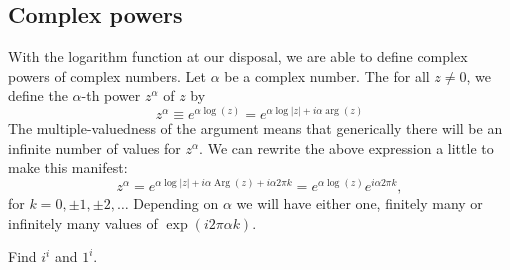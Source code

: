 \subsection{Complex powers}
With the logarithm function at our disposal, we are able to define complex powers of complex numbers. Let $\alpha$ be a complex number. The for all $z \neq 0$, we define the $\alpha$-th power $z^\alpha$ of $z$ by
$$
\boxed{z^\alpha \equiv e^{\alpha \log (z)}=e^{\alpha \log |z|+i \alpha \arg (z)}}
$$
The multiple-valuedness of the argument means that generically there will be an infinite number of values for $z^\alpha$. We can rewrite the above expression a little to make this manifest:
$$
z^\alpha=e^{\alpha \log |z|+i \alpha \operatorname{Arg}(z)+i \alpha 2 \pi k}=e^{\alpha \log (z)} e^{i \alpha 2 \pi k},
$$
for $k=0, \pm 1, \pm 2, \ldots$
Depending on $\alpha$ we will have either one, finitely many or infinitely many values of $\exp (i 2 \pi \alpha k)$.
\begin{exercise}
    Find $i^i$ and $1^i$. 
\end{exercise}
